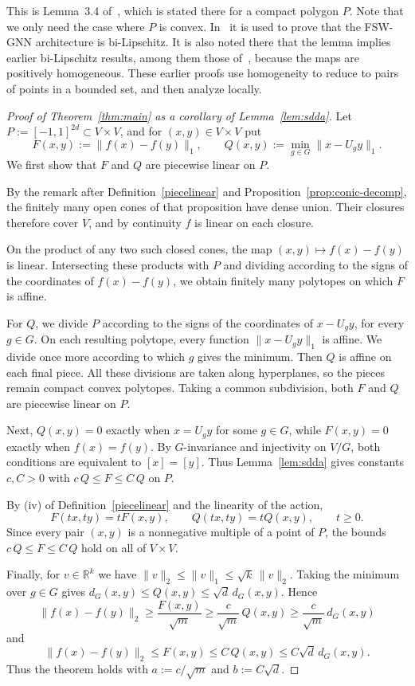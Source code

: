 \documentclass[11pt]{article}
\newcommand{\R}{\mathbb{R}}
\theoremstyle{definition}
\begin{document}
	This is Lemma~3.4 of~\cite{sverdlov2024fsw}, which is stated there for a compact
	polygon $P$. Note that we only need the case where $P$ is convex. In~\cite{sverdlov2024fsw} it is used to prove that the
	FSW-GNN architecture is bi-Lipschitz. It is also noted there that the lemma implies
	earlier bi-Lipschitz results, among them those
	of~\cite{balan2023stab,balan2024sorting,balan2025permutation}, because the maps are positively homogeneous. These earlier proofs use homogeneity to reduce to pairs of points in a bounded set, and then
	analyze locally.


\begin{proof}[Proof of Theorem~\ref{thm:main} as a corollary of Lemma~\ref{lem:sdda}]
	Let $P:=[-1,1]^{2d}\subset V\times V$, and for
	$(x,y)\in V\times V$ put
	\[
	F(x,y):=\|f(x)-f(y)\|_1,\qquad
	Q(x,y):=\min_{g\in G}\|x-U_gy\|_1.
	\]
	We first show that $F$ and $Q$ are piecewise linear on $P$.
	
	By the remark after Definition~\ref{piecelinear} and
	Proposition~\ref{prop:conic-decomp}, the finitely many open
	cones of that proposition have dense union. Their closures
	therefore cover $V$, and by continuity $f$ is linear on
	each closure.
	
	On the product of any two such closed cones, the map
	$(x,y)\mapsto f(x)-f(y)$ is linear.
	Intersecting these products with $P$ and dividing according
	to the signs of the coordinates of $f(x)-f(y)$, we obtain
	finitely many polytopes on which $F$ is affine.
	
	For $Q$, we divide $P$ according to the signs of the
	coordinates of $x-U_gy$, for every $g\in G$.
	On each resulting polytope, every function
	$\|x-U_gy\|_1$ is affine.
	We divide once more according to which $g$ gives the
	minimum. Then $Q$ is affine on each final piece.
	All these divisions are taken along hyperplanes, so the pieces
	remain compact convex polytopes. Taking a common
	subdivision, both $F$ and $Q$ are piecewise linear on $P$.
	
	Next, $Q(x,y)=0$ exactly when $x=U_gy$ for some
	$g\in G$, while $F(x,y)=0$ exactly when $f(x)=f(y)$.
	By $G$-invariance and injectivity on $V/G$, both conditions
	are equivalent to $[x]=[y]$.
	Thus Lemma~\ref{lem:sdda} gives constants $c,C>0$ with
	$c\,Q\le F\le C\,Q$ on $P$.
	
	By (iv) of Definition~\ref{piecelinear} and the linearity
	of the action,
	\[
	F(tx,ty)=tF(x,y),\qquad
	Q(tx,ty)=tQ(x,y),\qquad t\ge0.
	\]
	Since every pair $(x,y)$ is a nonnegative multiple of
	a point of $P$, the bounds $c\,Q\le F\le C\,Q$
	hold on all of $V\times V$.
	
	Finally, for $v\in\R^k$ we have
	$\|v\|_2\le\|v\|_1\le\sqrt{k}\,\|v\|_2$.
	Taking the minimum over $g\in G$ gives
	$d_G(x,y)\le Q(x,y)\le\sqrt d\,d_G(x,y)$.
	Hence
	\[
	\|f(x)-f(y)\|_2
	\ge \frac{F(x,y)}{\sqrt m}
	\ge \frac{c}{\sqrt m}\,Q(x,y)
	\ge \frac{c}{\sqrt m}\,d_G(x,y)
	\]
	and
	\[
	\|f(x)-f(y)\|_2
	\le F(x,y)
	\le C\,Q(x,y)
	\le C\sqrt d\,d_G(x,y).
	\]
	Thus the theorem holds with $a:=c/\sqrt m$
	and $b:=C\sqrt d$. 
\end{proof}
\end{document}

